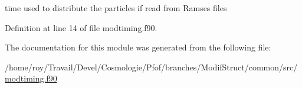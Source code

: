 time used to distribute the particles if read from Ramses files 



Definition at line 14 of file modtiming.\-f90.



The documentation for this module was generated from the following file\-:\begin{DoxyCompactItemize}
\item 
/home/roy/\-Travail/\-Devel/\-Cosmologie/\-Pfof/branches/\-Modif\-Struct/common/src/\hyperlink{modtiming_8f90}{modtiming.\-f90}\end{DoxyCompactItemize}
